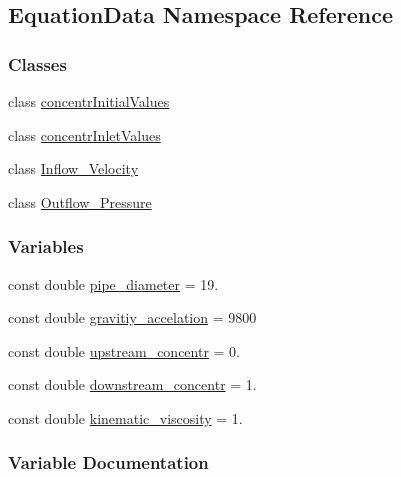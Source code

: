 \hypertarget{namespace_equation_data}{}\subsection{Equation\+Data Namespace Reference}
\label{namespace_equation_data}
\subsubsection*{Classes}
\begin{DoxyCompactItemize}
\item 
class \hyperlink{class_equation_data_1_1concentr_initial_values}{concentr\+Initial\+Values}
\item 
class \hyperlink{class_equation_data_1_1concentr_inlet_values}{concentr\+Inlet\+Values}
\item 
class \hyperlink{class_equation_data_1_1_inflow___velocity}{Inflow\+\_\+\+Velocity}
\item 
class \hyperlink{class_equation_data_1_1_outflow___pressure}{Outflow\+\_\+\+Pressure}
\end{DoxyCompactItemize}
\subsubsection*{Variables}
\begin{DoxyCompactItemize}
\item 
const double \hyperlink{namespace_equation_data_a8a2de541b8b542073fd84d608d36994a}{pipe\+\_\+diameter} = 19.
\item 
const double \hyperlink{namespace_equation_data_aaa67c6160039911ad0a48e345082d6c7}{gravitiy\+\_\+accelation} = 9800
\item 
const double \hyperlink{namespace_equation_data_a104382ed0befd669cf5ec81dfa13425e}{upstream\+\_\+concentr} = 0.
\item 
const double \hyperlink{namespace_equation_data_a4ae0be08a5d532f2c298df33760cb50e}{downstream\+\_\+concentr} = 1.
\item 
const double \hyperlink{namespace_equation_data_a87e6c1ce019dcf40290b9149bf65065b}{kinematic\+\_\+viscosity} = 1.
\end{DoxyCompactItemize}


\subsubsection{Variable Documentation}
\hypertarget{namespace_equation_data_a4ae0be08a5d532f2c298df33760cb50e}{}
